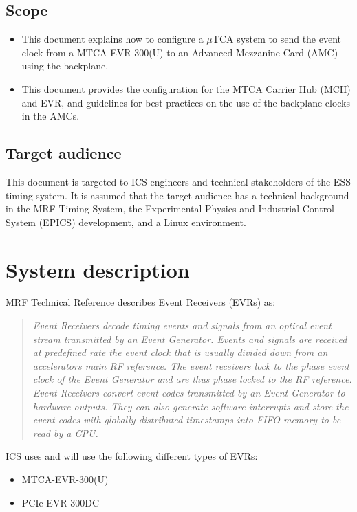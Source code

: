 \documentclass[11pt
  , a4paper
  , article
  , oneside
  , showtrims
]{memoir}
\begin{document}
\section{Scope}
\begin{itemize}
\item This document explains how to configure a $\mu$TCA system to send the event clock from a MTCA-EVR-300(U) to an Advanced Mezzanine Card (AMC) using the backplane.
\item This document provides the configuration for the MTCA Carrier Hub (MCH) and EVR, and guidelines for best practices on the use of the backplane clocks in the AMCs.
\end{itemize}

\section{Target audience}
This document is targeted to ICS engineers and technical stakeholders of the ESS timing system. It is assumed that the target audience has a technical background in the MRF Timing System, the Experimental Physics and Industrial Control System (EPICS) development, and a Linux environment.\\


\chapter{System description}
MRF Technical Reference \citep[see][p45]{MRFEVENTSYSTEMDC} describes Event Receivers (EVRs) as:
\blockquote{\textit{Event Receivers decode timing events and signals from an optical event stream transmitted by an Event Generator. Events and signals are received at predefined rate the event clock that is usually divided down from an accelerators main RF reference. The event receivers lock to the phase event clock of the Event Generator and are thus phase locked to the RF reference. Event Receivers convert event codes transmitted by an Event Generator to hardware outputs. They can also generate software interrupts and store the event codes with globally distributed timestamps into FIFO memory to be read by a CPU.}}

ICS uses and will use the following different types of EVRs:
\begin{itemize}
\item MTCA-EVR-300(U)
\item PCIe-EVR-300DC
\end{itemize}
\end{document}

